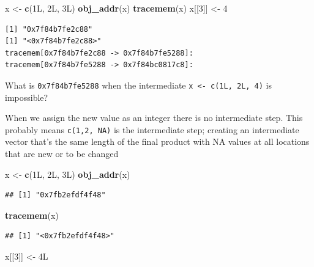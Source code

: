 \documentclass[]{book}
\newenvironment{Shaded}{\begin{snugshade}}{\end{snugshade}}
\newcommand{\DecValTok}[1]{\textcolor[rgb]{0.00,0.00,0.81}{#1}}
\newcommand{\KeywordTok}[1]{\textcolor[rgb]{0.13,0.29,0.53}{\textbf{#1}}}
\newcommand{\NormalTok}[1]{#1}
\newcommand{\StringTok}[1]{\textcolor[rgb]{0.31,0.60,0.02}{#1}}
\begin{document}
\begin{Shaded}
\begin{Highlighting}[]
\NormalTok{x <-}\StringTok{ }\KeywordTok{c}\NormalTok{(1L, 2L, 3L)}
\KeywordTok{obj_addr}\NormalTok{(x)}
\KeywordTok{tracemem}\NormalTok{(x)}
\NormalTok{x[[}\DecValTok{3}\NormalTok{]] <-}\StringTok{ }\DecValTok{4}
\end{Highlighting}
\end{Shaded}

\begin{verbatim}
[1] "0x7f84b7fe2c88"
[1] "<0x7f84b7fe2c88>"
tracemem[0x7f84b7fe2c88 -> 0x7f84b7fe5288]: 
tracemem[0x7f84b7fe5288 -> 0x7f84bc0817c8]: 
\end{verbatim}

What is \texttt{0x7f84b7fe5288} when the intermediate \texttt{x\ \textless{}-\ c(1L,\ 2L,\ 4)} is impossible?

When we assign the new value as an integer there is no intermediate step. This probably means \texttt{c(1,2,\ NA)} is the intermediate step; creating an intermediate vector that's the same length of the final product with NA values at all locations that are new or to be changed

\begin{Shaded}
\begin{Highlighting}[]
\NormalTok{x <-}\StringTok{ }\KeywordTok{c}\NormalTok{(1L, 2L, 3L)}
\KeywordTok{obj_addr}\NormalTok{(x)}
\end{Highlighting}
\end{Shaded}

\begin{verbatim}
## [1] "0x7fb2efdf4f48"
\end{verbatim}

\begin{Shaded}
\begin{Highlighting}[]
\KeywordTok{tracemem}\NormalTok{(x)}
\end{Highlighting}
\end{Shaded}

\begin{verbatim}
## [1] "<0x7fb2efdf4f48>"
\end{verbatim}

\begin{Shaded}
\begin{Highlighting}[]
\NormalTok{x[[}\DecValTok{3}\NormalTok{]] <-}\StringTok{ }\NormalTok{4L}
\end{Highlighting}
\end{Shaded}
\end{document}
